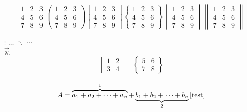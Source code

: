 \documentclass{book}
\begin{document}
\begin{equation}
	\begin{matrix}
		1 & 2 & 3 \\
		4 & 5 & 6 \\
		7 & 8 & 9
	\end{matrix}
	\begin{pmatrix}
		1 & 2 & 3 \\
		4 & 5 & 6 \\
		7 & 8 & 9
	\end{pmatrix}
	\begin{bmatrix}
		1 & 2 & 3 \\
		4 & 5 & 6 \\
		7 & 8 & 9
	\end{bmatrix}
	\begin{Bmatrix}
		1 & 2 & 3 \\
		4 & 5 & 6 \\
		7 & 8 & 9
	\end{Bmatrix}
	\begin{vmatrix}
		1 & 2 & 3 \\
		4 & 5 & 6 \\
		7 & 8 & 9
	\end{vmatrix}
	\begin{Vmatrix}
		1 & 2 & 3 \\
		4 & 5 & 6 \\
		7 & 8 & 9
	\end{Vmatrix}
\end{equation}

$\vdots$
$\hdots$
$\ddots$
$\cdots$ \\
$\vec{x}$\\
$\ldots$
\begin{equation}
	\begin{array}{cc}
		\left[\begin{array}{cc}
			1 & 2 \\
			3 & 4
		\end{array}\right] &
		\left\{\begin{array}{cc}
			5 & 6 \\
			7 & 8
		\end{array}\right\} \\
	\end{array}
\end{equation}
\begin{equation}
	A = \overbrace{a_1 + a_2 + \cdots + a_n}^{1}
	+ \underbrace{b_1 + b_2 + \cdots + b_n}_{2}	\cite{test}
\end{equation}




\cite{bookBib}



\end{document}
